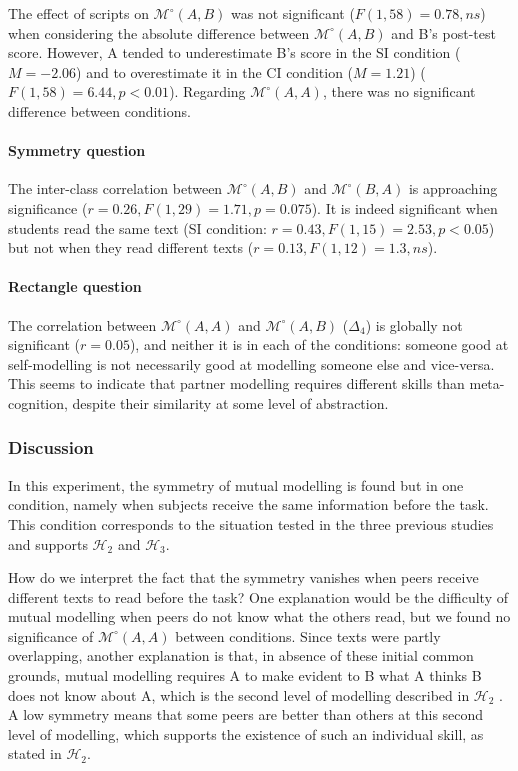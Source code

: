 \documentclass[natbib]{svjour3}
\newcommand{\A}{A\xspace}
\newcommand{\B}{B\xspace}
\newcommand{\gModel}[2]{{$\mathcal{M}^{\circ}(#1, #2)$}}
\begin{document}
The effect of scripts on \gModel{A}{B} was not significant ($F(1, 58) = 0.78,
ns$) when considering the absolute difference between \gModel{A}{B} and \B's
post-test score. However, \A tended to underestimate \B's score in the SI
condition ($M = -2.06$) and to overestimate it in the CI condition ($M = 1.21$)
($F(1, 58) = 6.44, p<0.01$).  Regarding \gModel{A}{A}, there was no
significant difference between conditions.

\paragraph{Symmetry question} The inter-class correlation between \gModel{A}{B}
and \gModel{B}{A} is approaching significance ($r= 0.26, F(1,29)=1.71, p=
0.075$). It is indeed significant when students read the same text (SI
condition: $r=0.43, F(1,15)=2.53, p<0.05$) but not when they read different texts
($r= 0.13, F(1,12)=1.3, ns$). 

\paragraph{Rectangle question} The correlation between \gModel{A}{A} and
\gModel{A}{B} ($\Delta_4$) is globally not significant ($r=0.05$), and neither
it is in each of the conditions: someone good at self-modelling is not necessarily
good at modelling someone else and vice-versa.  This seems to indicate that
partner modelling requires different skills than meta-cognition, despite their
similarity at some level of abstraction.

\subsubsection*{Discussion}

In this experiment, the symmetry of mutual modelling is  found but  in one
condition, namely when subjects receive the same information before the task.
This condition corresponds to the situation tested in the three previous studies
and supports  $\mathcal{H}_{2}$ and  $\mathcal{H}_{3}$. 

How do we interpret the fact that the symmetry vanishes when peers receive
different texts to read before the task? One explanation would be the difficulty
of mutual modelling when peers do not know what the others read, but we found no
significance of \gModel{A}{A} between conditions. Since texts were partly
overlapping, another explanation is that, in absence of these initial common
grounds, mutual modelling requires \A to make evident to \B what \A thinks \B does
not know about A, which is the second level of modelling described in
$\mathcal{H}_{2}$ . A low symmetry means that some peers are better than others
at this second level of modelling, which supports the existence of such an
individual skill, as stated in  $\mathcal{H}_{2}$.
\end{document}
